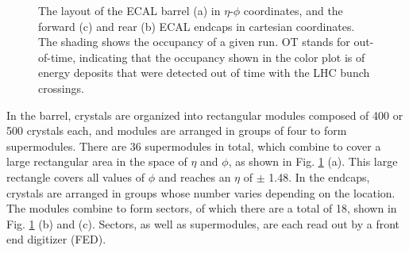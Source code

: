 \begin{figure}[t]
\caption{The layout of the ECAL barrel (a) in $\eta$-$\phi$ coordinates, and the forward (c) and rear (b) ECAL endcaps in cartesian coordinates. The shading shows the occupancy of a given run. OT stands for out-of-time, indicating that the occupancy shown in the color plot is of energy deposits that were detected out of time with the LHC bunch crossings.} 
\label{fig:EcalLayout}
\end{figure}
\FloatBarrier

In the barrel, crystals are organized into rectangular modules composed of 400 or 500 crystals each, and modules are arranged in groups of four to form supermodules. There are 36 supermodules in total, which combine to cover a large rectangular area in the space of $\eta$ and $\phi$, as shown in Fig. \ref{fig:EcalLayout} (a). This large rectangle covers all values of $\phi$ and reaches an $\eta$ of $\pm$ 1.48. In the endcaps, crystals are arranged in groups whose number varies depending on the location. The modules combine to form sectors, of which there are a total of 18, shown in Fig. \ref{fig:EcalLayout} (b) and (c). Sectors, as well as supermodules, are each read out by a front end digitizer (FED).

